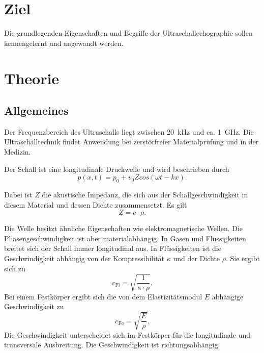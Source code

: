 \section{Ziel}

Die grundlegenden Eigenschaften und Begriffe der
Ultraschallechographie sollen kennengelernt und angewandt
werden.

\section{Theorie}
\label{sec:Theorie}
\subsection{Allgemeines} %
Der Frequenzbereich des Ultraschalls liegt zwischen 
\SI{20}{\kilo\hertz} und ca. \SI{1}{\giga\hertz}. 
Die Ultraschalltechnik findet Anwendung bei 
zerstörfreier Materialprüfung und in der Medizin. 

\noindent Der Schall ist eine longitudinale Druckwelle und wird 
beschrieben durch
\begin{equation*}
    p(x,t) = p_0 + v_0 Z cos(\omega t - kx).
\end{equation*}

\noindent Dabei ist $Z$ die akustische Impedanz, die sich aus der 
Schallgeschwindigkeit in diesem Material und dessen Dichte 
zusammensetzt. Es gilt 
\begin{equation*}
    Z = c \cdot \rho.
\end{equation*}

Die Welle besitzt ähnliche Eigenschaften wie 
elektromagnetische Wellen. Die Phasengeschwindigkeit 
ist aber materialabhängig. 
In Gasen und Flüssigkeiten breitet 
sich der Schall immer longitudinal aus. In Flüssigkeiten ist 
die Geschwindigkeit abhängig von der Kompressibilität 
$\kappa$ und der Dichte $\rho$. 
Sie ergibt sich zu 
\begin{equation*}
    c_{\text{Fl}}= \sqrt{\frac{1}{\kappa \cdot \rho}}.
\end{equation*}
Bei einem Festkörper ergibt sich die von dem Elastizitätsmodul
$E$ abhängige Geschwindigkeit zu 
\begin{equation*}
    c_{\text{Fe}}= \sqrt{\frac{E}{\rho}}.
\end{equation*}
Die Geschwindigkeit unterscheidet 
sich im Festkörper für die longitudinale und
transversale Ausbreitung. Die Geschwindigkeit ist richtungsabhängig.

